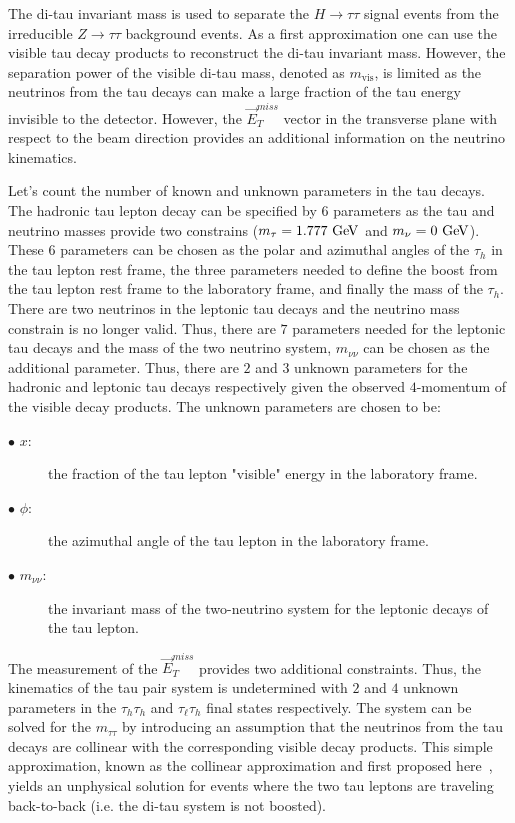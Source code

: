 The di-tau invariant mass is used to separate the $H \rightarrow \tau\tau$ signal events from the irreducible $Z\rightarrow\tau\tau$ background events. As a first approximation one can use the visible tau decay products to reconstruct the di-tau invariant mass. However, the separation power of the visible di-tau mass, denoted as $m_{\mathrm{vis}}$, is limited as the  neutrinos from the tau decays can make a large fraction of the tau energy invisible to the detector. However, the $\vec{E}_{T}^{miss}$ vector in the transverse plane with respect to the beam direction provides an additional information on the neutrino kinematics. 

Let's count the number of known and unknown parameters in the tau decays. The hadronic tau lepton decay can be specified by $6$ parameters as the tau and neutrino masses provide two constrains ($m_{\tau}=1.777~\mathrm{Ge\kern -0.1em V}$ and $m_{\nu}=0~\mathrm{Ge\kern -0.1em V}$). These $6$ parameters can be chosen as the polar and azimuthal angles of the $\tau_h$ in the tau lepton rest frame, the three parameters needed to define the boost from the tau lepton rest frame to the laboratory frame, and finally the  mass of the $\tau_h$. There are two neutrinos in the leptonic tau decays and the neutrino mass constrain is no longer valid. Thus, there are $7$ parameters needed for the leptonic tau decays and the mass of the two neutrino system, $m_{\nu\nu}$ can be chosen as the additional parameter.  Thus, there are $2$ and $3$ unknown parameters for the hadronic and leptonic tau decays respectively given the observed $4$-momentum of the visible decay products. The unknown parameters are chosen to be:

\begin{description}
\item[$\bullet$ $x$:] the fraction of the tau lepton "visible" energy in the laboratory frame.
\item[$\bullet$ $\phi$:] the azimuthal angle of the tau lepton in the laboratory frame.
\item[$\bullet$ $m_{\nu\nu}$:] the invariant mass of the two-neutrino system for the leptonic decays of the tau lepton. 
\end{description}

The measurement of the $\vec{E}_{T}^{miss}$ provides two additional constraints. Thus, the kinematics of the tau pair system is undetermined with $2$ and $4$ unknown parameters in the $\tau_h\tau_h$ and $\tau_{\ell}\tau_h$ final states respectively.  The system can be solved for the $m_{\tau\tau}$ by introducing an assumption that the neutrinos from the tau decays are collinear with the corresponding visible decay products. This simple approximation, known as the collinear approximation and first proposed here~\cite{Ellis:1987xu}, yields an unphysical solution for events where the two tau leptons are traveling back-to-back (i.e. the di-tau system is not boosted). 


